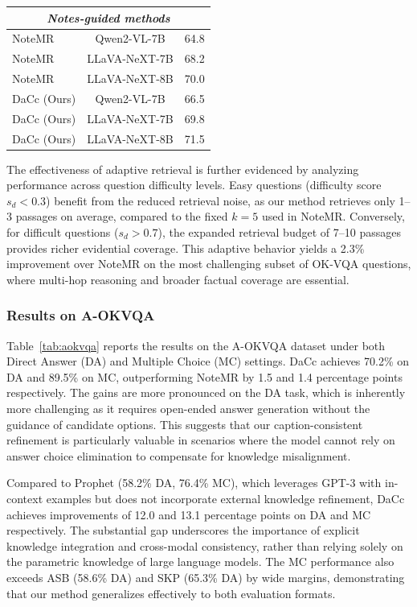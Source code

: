 \documentclass[manuscript,screen,review]{acmart}
\begin{document}
\begin{table}[t]
\begin{tabular}{l c c}
\hline
\multicolumn{3}{c}{\textit{Notes-guided methods}} \\
\hline
NoteMR           & Qwen2-VL-7B    & 64.8 \\
NoteMR           & LLaVA-NeXT-7B  & 68.2 \\
NoteMR           & LLaVA-NeXT-8B  & 70.0 \\
\hline
DaCc (Ours)      & Qwen2-VL-7B    & 66.5 \\
DaCc (Ours)      & LLaVA-NeXT-7B  & 69.8 \\
DaCc (Ours)      & LLaVA-NeXT-8B  & 71.5 \\
\hline
\end{tabular}
\end{table}

The effectiveness of adaptive retrieval is further evidenced by analyzing performance across question difficulty levels. Easy questions (difficulty score $s_d < 0.3$) benefit from the reduced retrieval noise, as our method retrieves only 1--3 passages on average, compared to the fixed $k=5$ used in NoteMR. Conversely, for difficult questions ($s_d > 0.7$), the expanded retrieval budget of 7--10 passages provides richer evidential coverage. This adaptive behavior yields a 2.3\% improvement over NoteMR on the most challenging subset of OK-VQA questions, where multi-hop reasoning and broader factual coverage are essential.

\subsubsection{Results on A-OKVQA}

Table~\ref{tab:aokvqa} reports the results on the A-OKVQA dataset under both Direct Answer (DA) and Multiple Choice (MC) settings. DaCc achieves 70.2\% on DA and 89.5\% on MC, outperforming NoteMR by 1.5 and 1.4 percentage points respectively. The gains are more pronounced on the DA task, which is inherently more challenging as it requires open-ended answer generation without the guidance of candidate options. This suggests that our caption-consistent refinement is particularly valuable in scenarios where the model cannot rely on answer choice elimination to compensate for knowledge misalignment.

Compared to Prophet (58.2\% DA, 76.4\% MC), which leverages GPT-3 with in-context examples but does not incorporate external knowledge refinement, DaCc achieves improvements of 12.0 and 13.1 percentage points on DA and MC respectively. The substantial gap underscores the importance of explicit knowledge integration and cross-modal consistency, rather than relying solely on the parametric knowledge of large language models. The MC performance also exceeds ASB (58.6\% DA) and SKP (65.3\% DA) by wide margins, demonstrating that our method generalizes effectively to both evaluation formats.
\end{document}
